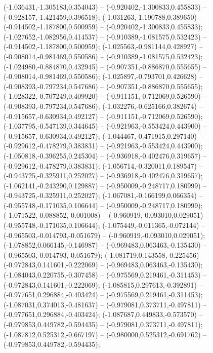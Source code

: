  (-1.036431,-1.305183,0.354043) -- (-0.920402,-1.300833,0.455833) -- (-0.928157,-1.421459,0.396518);
 (-1.031263,-1.190788,0.389650) -- (-0.914502,-1.187800,0.500959) -- (-0.920402,-1.300833,0.455833);
 (-1.027652,-1.082956,0.414537) -- (-0.910389,-1.081575,0.532423) -- (-0.914502,-1.187800,0.500959);
 (-1.025563,-0.981144,0.428927) -- (-0.908014,-0.981469,0.550586) -- (-0.910389,-1.081575,0.532423);
 (-1.024980,-0.884870,0.432945) -- (-0.907351,-0.886870,0.555655) -- (-0.908014,-0.981469,0.550586);
 (-1.025897,-0.793701,0.426628) -- (-0.908393,-0.797234,0.547686) -- (-0.907351,-0.886870,0.555655);
 (-1.028322,-0.707249,0.409920) -- (-0.911151,-0.712069,0.526590) -- (-0.908393,-0.797234,0.547686);
 (-1.032276,-0.625166,0.382674) -- (-0.915657,-0.630934,0.492127) -- (-0.911151,-0.712069,0.526590);
 (-1.037795,-0.547139,0.344645) -- (-0.921963,-0.553424,0.443900) -- (-0.915657,-0.630934,0.492127);
 (-1.044467,-0.471915,0.297140) -- (-0.929612,-0.478279,0.383831) -- (-0.921963,-0.553424,0.443900);
 (-1.050818,-0.396255,0.245304) -- (-0.936918,-0.402476,0.319657) -- (-0.929612,-0.478279,0.383831);
 (-1.056714,-0.320011,0.189547) -- (-0.943725,-0.325911,0.252027) -- (-0.936918,-0.402476,0.319657);
 (-1.062141,-0.243290,0.129887) -- (-0.950009,-0.248717,0.180999) -- (-0.943725,-0.325911,0.252027);
 (-1.067081,-0.166199,0.066354) -- (-0.955748,-0.171035,0.106644) -- (-0.950009,-0.248717,0.180999);
 (-1.071522,-0.088852,-0.001008) -- (-0.960919,-0.093010,0.029051) -- (-0.955748,-0.171035,0.106644);
 (-1.075449,-0.011365,-0.072144) -- (-0.965503,-0.014793,-0.051679) -- (-0.960919,-0.093010,0.029051);
 (-1.078852,0.066145,-0.146987) -- (-0.969483,0.063463,-0.135430) -- (-0.965503,-0.014793,-0.051679);
 (-1.081719,0.143558,-0.225456) -- (-0.972843,0.141601,-0.222069) -- (-0.969483,0.063463,-0.135430);
 (-1.084043,0.220755,-0.307458) -- (-0.975569,0.219461,-0.311453) -- (-0.972843,0.141601,-0.222069);
 (-1.085815,0.297613,-0.392891) -- (-0.977651,0.296884,-0.403424) -- (-0.975569,0.219461,-0.311453);
 (-1.087031,0.374013,-0.481637) -- (-0.979081,0.373711,-0.497811) -- (-0.977651,0.296884,-0.403424);
 (-1.087687,0.449833,-0.573570) -- (-0.979853,0.449782,-0.594435) -- (-0.979081,0.373711,-0.497811);
 (-1.087812,0.525312,-0.667197) -- (-0.980000,0.525312,-0.691762) -- (-0.979853,0.449782,-0.594435);

